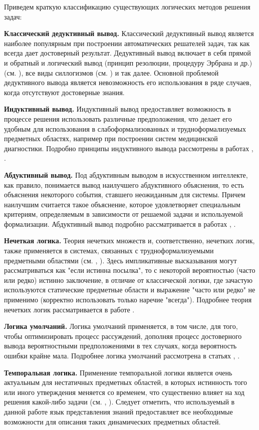 Приведем краткую классификацию существующих логических методов решения задач:
\begin{textitemize}
	\item{\textbf{Классический дедуктивный вывод.} Классический дедуктивный вывод является наиболее популярным при построении автоматических решателей задач, так как всегда дает достоверный результат. Дедуктивный вывод включает в себя прямой и обратный и логический вывод (принцип резолюции, процедуру Эрбрана и др.) (см. ), все виды силлогизмов (см. ) и так далее. Основной проблемой дедуктивного вывода является невозможность его использования в ряде случаев, когда отсутствуют достоверные знания.}
	\item{\textbf{Индуктивный вывод.} Индуктивный вывод предоставляет возможность в процессе решения использовать различные предположения, что делает его удобным для использования в слабоформализованных и трудноформализуемых предметных областях, например при построении систем медицинской диагностики. Подробно принципы индуктивного вывода рассмотрены в работах , .}
	\item{\textbf{Абдуктивный вывод.} Под абдуктивным выводом в искусственном интеллекте, как правило, понимается вывод наилучшего абдуктивного объяснения, то есть объяснения некоторого события, ставшего неожиданным для системы. Причем наилучшим считается такое объяснение, которое удовлетворяет специальным критериям, определяемым в зависимости от решаемой задачи и используемой	формализации. Абдуктивный вывод подробно рассматривается в работах , .}
	\item{\textbf{Нечеткая логика.} Теория нечетких множеств и, соответственно, нечетких логик, также применяется в системах, связанных с трудноформализуемыми предметными областями (см. , ). Здесь импликативные высказывания могут рассматриваться как "если истинна посылка"{}, то с некоторой вероятностью (часто или редко) истинно заключение, в отличие от классической логики, где зачастую используются статические предметные области и выражение "часто или редко"{} не применимо (корректно использовать только наречие "всегда"{}). Подробнее теория нечетких логик рассматривается в работе .}
	\item{\textbf{Логика умолчаний.} Логика умолчаний применяется, в том числе, для того, чтобы оптимизировать процесс рассуждений,	дополняя процесс достоверного вывода вероятностными  предположениями в тех случаях, когда вероятность ошибки крайне мала. Подробнее логика умолчаний рассмотрена в статьях , .}
	\item{\textbf{Темпоральная логика.} Применение темпоральной логики является очень актуальным для нестатичных предметных областей, в которых истинность того или иного утверждения меняется со временем, что существенно влияет на ход решения какой-либо задачи (см. , ). Следует отметить, что используемый в данной работе язык представления знаний предоставляет все необходимые возможности для описания таких динамических предметных областей.}
\end{textitemize}

